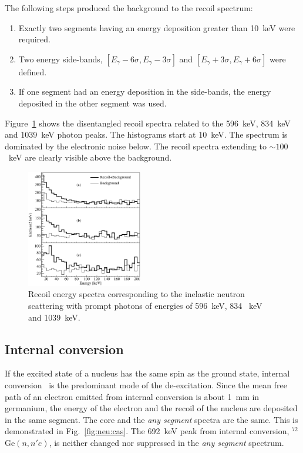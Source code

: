 The following steps produced the background to the recoil spectrum:
\begin{enumerate}
\item Exactly two segments having an energy deposition greater than
  10~keV were required.
\item Two energy side-bands, $[E_\gamma-6\sigma, E_\gamma-3\sigma]$
  and $[E_\gamma+3\sigma, E_\gamma+6\sigma]$ were defined.
\item If one segment had an energy deposition in the side-bands, the
  energy deposited in the other segment was used.
\end{enumerate}

Figure~\ref{fig:neu:recoil} shows the disentangled recoil spectra related to the 596~keV, 834~keV and 1039~keV photon peaks. The histograms start at 10~keV. The spectrum is dominated by the electronic noise below. The recoil spectra extending to $\sim 100$~keV are clearly visible above the background.

\begin{figure}[tbhp]
  \centering
  \includegraphics[width=0.45\textwidth]{recoil}
  \caption{Recoil energy spectra corresponding to the inelastic
    neutron scattering with prompt photons of energies of 596~keV, 834
    ~keV and 1039~keV.}
  \label{fig:neu:recoil}
\end{figure}

\subsection{Internal conversion}
\label{sec:neu:conv}
If the excited state of a nucleus has the same spin as the ground
state, internal conversion~\cite{Lis69,Kra56} is the predominant mode
of the de-excitation. Since the mean free path of an electron emitted
from internal conversion is about 1~mm in germanium, the energy of the
electron and the recoil of the nucleus are deposited in the same
segment. The core and the \emph{any segment} spectra are the same.
This is demonstrated in Fig.~\ref{fig:neu:cas}. The 692~keV peak from
internal conversion, $^{72}$Ge$(n,n'e)$, is neither changed nor
suppressed in the \emph{any segment} spectrum.

